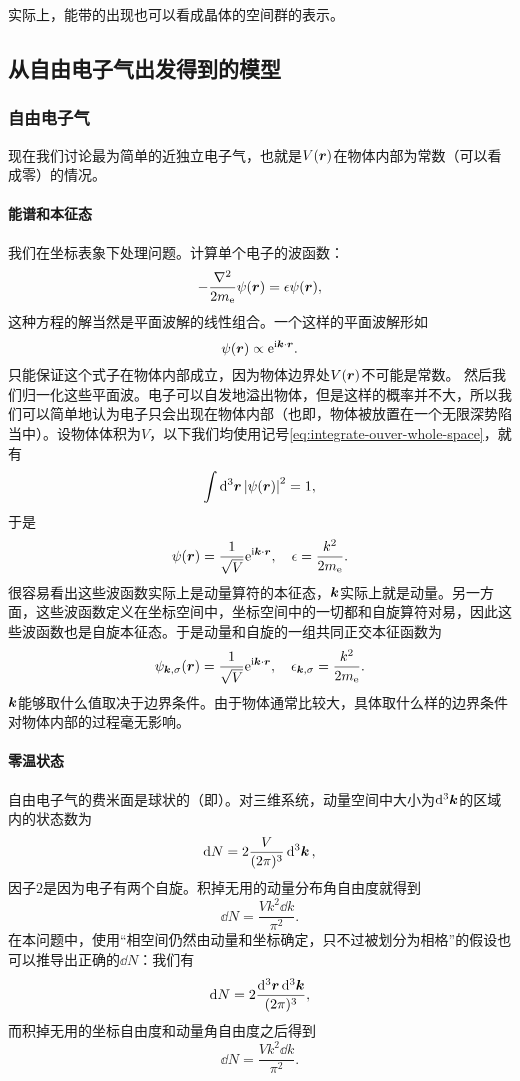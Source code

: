 实际上，能带的出现也可以看成晶体的空间群的表示。

\subsection{从自由电子气出发得到的模型}

\subsubsection{自由电子气}

现在我们讨论最为简单的近独立电子气，也就是$V(\vb*{r})$在物体内部为常数（可以看成零）的情况。

\paragraph{能谱和本征态} 我们在坐标表象下处理问题。计算单个电子的波函数：
\[
    - \frac{\laplacian}{2m_\text{e}} \psi(\vb*{r}) = \epsilon \psi(\vb*{r}),
\]
这种方程的解当然是平面波解的线性组合。一个这样的平面波解形如
\[
    \psi(\vb*{r}) \propto \mathrm{e}^{\mathrm{i} \vb*{k} \cdot \vb*{r}}.
\]
只能保证这个式子在物体内部成立，因为物体边界处$V(\vb*{r})$不可能是常数。
然后我们归一化这些平面波。电子可以自发地溢出物体，但是这样的概率并不大，所以我们可以简单地认为电子只会出现在物体内部（也即，物体被放置在一个无限深势陷当中）。设物体体积为$V$，以下我们均使用记号\eqref{eq:integrate-ouver-whole-space}，就有
\[
    \int \dd[3]{\vb*{r}} \abs{\psi(\vb*{r})}^2 = 1,
\]
于是
\[
    \psi (\vb*{r}) = \frac{1}{\sqrt{V}} \mathrm{e}^{\mathrm{i} \vb*{k} \cdot \vb*{r}}, \quad \epsilon = \frac{k^2}{2m_\text{e}}.
\]
很容易看出这些波函数实际上是动量算符的本征态，$\vb*{k}$实际上就是动量。另一方面，这些波函数定义在坐标空间中，坐标空间中的一切都和自旋算符对易，因此这些波函数也是自旋本征态。于是动量和自旋的一组共同正交本征函数为
\begin{equation}
    \psi_{\vb*{k},\sigma} (\vb*{r}) = \frac{1}{\sqrt{V}} \mathrm{e}^{\mathrm{i} \vb*{k} \cdot \vb*{r}}, \quad \epsilon_{\vb*{k},\sigma} = \frac{k^2}{2m_\text{e}}.
\end{equation}
$\vb*{k}$能够取什么值取决于边界条件。由于物体通常比较大，具体取什么样的边界条件对物体内部的过程毫无影响。

\paragraph{零温状态} 自由电子气的费米面是球状的（即）。对三维系统，动量空间中大小为$\dd[3]{\vb*{k}}$的区域内的状态数为
\begin{equation}
    \dd{N} = 2 \frac{V}{(2\pi)^3} \dd[3]{\vb*{k}},
\end{equation}
因子$2$是因为电子有两个自旋。积掉无用的动量分布角自由度就得到
\begin{equation}
    \dd{N} = \frac{V k^2 \dd{k}}{\pi^2}.
\end{equation}
在本问题中，使用“相空间仍然由动量和坐标确定，只不过被划分为相格”的假设也可以推导出正确的$\dd{N}$：我们有
\[
    \dd{N} = 2 \frac{\dd[3]{\vb*{r}} \dd[3]{\vb*{k}}}{(2\pi)^3},
\]
而积掉无用的坐标自由度和动量角自由度之后得到
\[
    \dd{N} = \frac{V k^2 \dd{k}}{\pi^2}.
\]

